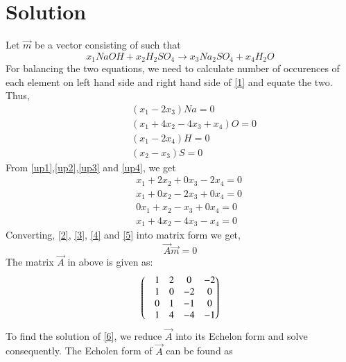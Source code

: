 \documentclass[journal,12pt,twocolumn]{IEEEtran}
\begin{document}
\section{Solution}
Let $\vec{m}$ be a vector consisting of  such that
\begin{equation}\label{1}
 x_1NaOH + x_2H_2SO_4 \xrightarrow{} x_3Na_2SO_4  +  x_4H_2O
\end{equation}
For balancing the two equations, we need to calculate number of occurences of each element on left hand side and right hand side of \ref{1} and equate the two. Thus,
\begin{align}
 & \qquad (x_1 - 2x_3)Na = 0 \label{up1} \\ 
 & \qquad (x_1+4x_2-4x_3+x_4)O = 0 \label{up2}  \\ 
 & \qquad (x_1-2x_4)H = 0  \label{up3} \\ 
 & \qquad (x_2-x_3)S = 0 \label{up4}
\end{align}
From \ref{up1},\ref{up2},\ref{up3} and \ref{up4}, we get
\begin{align}	
 \quad & x_1  +  2x_2  +  0x_3 - 2x_4 =   0 \label{2} \\
 \quad & x_1  +  0x_2  - 2x_3 + 0x_4  =  0 \label{3} \\
 \quad & 0x_1   + x_2 - x_3 + 0x_4   = 0 \label{4} \\
 \quad & x_1 +  4x_2 - 4x_3 - x_4  = 0 \label{5}
\end{align}
Converting, \ref{2}, \ref{3}, \ref{4} and \ref{5} into matrix form we get,
\begin{equation}\label{6}
	\vec{A}\vec{m} = 0
\end{equation}
The matrix $\vec{A}$ in above is given as:
\begin{equation}
	\begin{pmatrix}&1 &2 &0 &-2 \\ &1 &0 &-2 &0 \\ &0 &1 &-1 &0 \\&1 &4 &-4 &-1\end{pmatrix}
\end{equation}
To find the solution of \ref{6}, we reduce $\vec{A}$ into its Echelon form and solve consequently. The Echolen form of $\vec{A}$ can be found as
\end{document}
